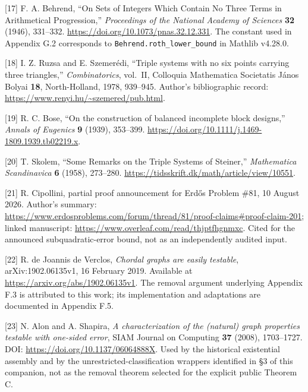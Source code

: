 \documentclass[english,11pt,a4paper]{article}
\begin{document}
{[}17{]} F. A. Behrend, ``On Sets of Integers Which Contain No Three
Terms in Arithmetical Progression,'' \emph{Proceedings of the National
Academy of Sciences} \textbf{32} (1946), 331--332.
\url{https://doi.org/10.1073/pnas.32.12.331}. The constant used in
Appendix G.2 corresponds to \nolinkurl{Behrend.roth_lower_bound} in
Mathlib v4.28.0.

{[}18{]} I. Z. Ruzsa and E. Szemerédi, ``Triple systems with no six
points carrying three triangles,'' \emph{Combinatorics}, vol.~II,
Colloquia Mathematica Societatis János Bolyai \textbf{18},
North-Holland, 1978, 939--945. Author's bibliographic record:
\url{https://www.renyi.hu/~szemered/pub.html}.

{[}19{]} R. C. Bose, ``On the construction of balanced incomplete block
designs,'' \emph{Annals of Eugenics} \textbf{9} (1939), 353--399.
\url{https://doi.org/10.1111/j.1469-1809.1939.tb02219.x}.

{[}20{]} T. Skolem, ``Some Remarks on the Triple Systems of Steiner,''
\emph{Mathematica Scandinavica} \textbf{6} (1958), 273--280.
\url{https://tidsskrift.dk/math/article/view/10551}.

{[}21{]} R. Cipollini, partial proof announcement for Erdős Problem
\#81, 10 August 2026. Author's summary:
\url{https://www.erdosproblems.com/forum/thread/81/proof-claims\#proof-claim-201};
linked manuscript: \url{https://www.overleaf.com/read/thjptfhgnmxc}.
Cited for the announced subquadratic-error bound, not as an
independently audited input.

{[}22{]} R. de Joannis de Verclos, \emph{Chordal graphs are easily
testable}, arXiv:1902.06135v1, 16 February 2019. Available at
\url{https://arxiv.org/abs/1902.06135v1}. The removal argument
underlying Appendix F.3 is attributed to this work; its implementation
and adaptations are documented in Appendix F.5.

{[}23{]} N. Alon and A. Shapira, \emph{A characterization of the
(natural) graph properties testable with one-sided error}, SIAM Journal
on Computing \textbf{37} (2008), 1703--1727. DOI:
\url{https://doi.org/10.1137/06064888X}. Used by the historical
existential assembly and by the unrestricted-classification wrappers
identified in §3 of this companion, not as the removal theorem selected
for the explicit public Theorem C.
\end{document}
